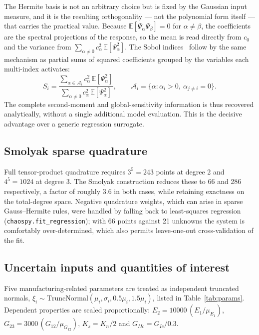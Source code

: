 \documentclass[review,3p,times,12pt,nopreprintline]{elsarticle}
\begin{document}
The Hermite basis is not an arbitrary choice but is fixed by the Gaussian input measure,
and it is the resulting orthogonality --- not the polynomial form itself --- that carries
the practical value. Because $\mathbb{E}[\Psi_\alpha\Psi_\beta]=0$ for $\alpha\ne\beta$,
the coefficients are the spectral projections of the response, so the mean is read directly
from $c_0$ and the variance from $\sum_{\alpha\ne0}c_\alpha^2\,\mathbb{E}[\Psi_\alpha^2]$.
The Sobol indices~\cite{saltelli2008} follow by the same mechanism as partial sums of
squared coefficients grouped by the variables each multi-index activates:
\begin{equation}
    S_i = \frac{\sum_{\alpha\in\mathcal{A}_i} c_\alpha^2\,\mathbb{E}[\Psi_\alpha^2]}
               {\sum_{\alpha\ne0} c_\alpha^2\,\mathbb{E}[\Psi_\alpha^2]},
    \qquad
    \mathcal{A}_i=\{\alpha:\alpha_i>0,\ \alpha_{j\ne i}=0\}.
    \label{eq:sobol}
\end{equation}
The complete second-moment and global-sensitivity information is thus recovered
analytically, without a single additional model evaluation. This is the decisive advantage
over a generic regression surrogate.

\subsection{Smolyak sparse quadrature}

Full tensor-product quadrature requires $3^5=243$ points at degree 2 and $4^5=1024$ at
degree 3. The Smolyak construction reduces these to 66 and 286 respectively, a factor of
roughly 3.6 in both cases, while retaining exactness on the total-degree space. Negative
quadrature weights, which can arise in sparse Gauss--Hermite rules, were handled by falling
back to least-squares regression (\texttt{chaospy.fit\_regression}); with 66 points against
21 unknowns the system is comfortably over-determined, which also permits leave-one-out
cross-validation of the fit.

\subsection{Uncertain inputs and quantities of interest}

Five manufacturing-related parameters are treated as independent truncated normals,
$\xi_i\sim\mathrm{TruncNormal}(\mu_i,\sigma_i,0.5\mu_i,1.5\mu_i)$, listed in
Table~\ref{tab:params}. Dependent properties are scaled proportionally:
$E_2=10000\,(E_1/\mu_{E_1})$, $G_{23}=3000\,(G_{12}/\mu_{G_{12}})$, $K_s=K_n/2$ and
$G_{IIc}=G_{Ic}/0.3$.
\end{document}
